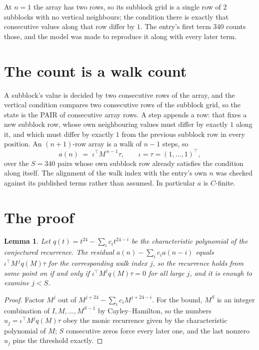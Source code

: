 \documentclass[11pt,a4paper]{article}
\theoremstyle{plain}
\newtheorem{lemma}[theorem]{Lemma}
\theoremstyle{definition}
\begin{document}
At $n=1$ the array has two rows, so its subblock grid is a single row of $2$ subblocks with
no vertical neighbours; the condition there is exactly that consecutive values along that row
differ by $1$. The entry's first term $340$ counts those, and the model was made to
reproduce it along with every later term.

\section{The count is a walk count}

A subblock's value is decided by two consecutive rows of the array, and the
vertical condition compares two consecutive rows of the subblock grid, so the state is the
PAIR of consecutive array rows. A step appends a row: that fixes a new subblock row, whose own
neighbouring values must differ by exactly $1$ along it, and which must differ by exactly
$1$ from the previous subblock row in every position. An $(n+1)$-row array is a walk of
$n-1$ steps, so
\[
a(n)\;=\;\iota^{\!\top}M^{\,n-1}\tau,\qquad\iota=\tau=(1,\dots,1)^{\!\top},
\]
over the $S=340$ pairs whose own subblock row already satisfies the condition along itself.
The alignment of the walk index with the entry's own $n$ was checked against its published
terms rather than assumed. In particular $a$ is $C$-finite.

\section{The proof}

\begin{lemma}\label{lem:crit}
Let $q(t)=t^{24}-\sum_i c_it^{24-i}$ be the characteristic polynomial of the
conjectured recurrence. The residual $a(n)-\sum_ic_ia(n-i)$ equals
$\iota^{\!\top}M^{\,j}q(M)\tau$ for the corresponding walk index $j$, so the recurrence
holds from some point on if and only if $\iota^{\!\top}M^{j}q(M)\tau=0$ for all large $j$,
and it is enough to examine $j<S$.
\end{lemma}

\begin{proof}
Factor $M^{j}$ out of $M^{j+24}-\sum_ic_iM^{j+24-i}$. For the bound, $M^{S}$
is an integer combination of $I,M,\dots,M^{S-1}$ by Cayley--Hamilton, so the numbers
$u_j=\iota^{\!\top}M^{j}q(M)\tau$ obey the monic recurrence given by the characteristic
polynomial of $M$; $S$ consecutive zeros force every later one, and the last nonzero $u_j$
pins the threshold exactly.
\end{proof}
\end{document}
